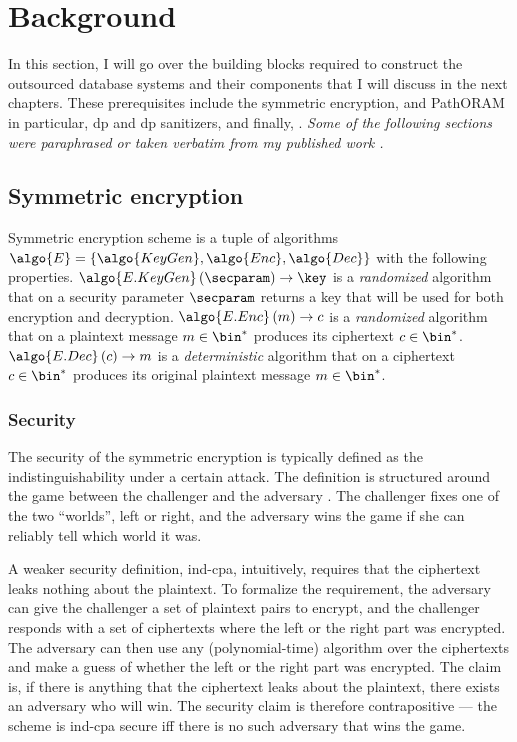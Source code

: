 \chapter{Background}\label{section:background}
\thispagestyle{myheadings}

	In this section, I will go over the building blocks required to construct the outsourced database systems and their components that I will discuss in the next chapters.
	These prerequisites include the symmetric encryption,  and PathORAM \cite{path-oram} in particular, \acrlong{dp} and \acrshort{dp} sanitizers, and finally, .
	\emph{Some of the following sections were paraphrased or taken verbatim from my published work \cite{ore-benchmark-17,epsolute}.}

	\section{Symmetric encryption}\label{section:background:encryption}

		Symmetric encryption scheme is a tuple of algorithms $\algo{E} = \{ \algo{KeyGen}, \algo{Enc}, \algo{Dec} \}$ with the following properties.
		$\algo{E.KeyGen} \left( \secparam \right) \to \key$ is a \emph{randomized} algorithm that on a security parameter $\secparam$ returns a key that will be used for both encryption and decryption.
		$\algo{E.Enc} \left( m \right) \to c$ is a \emph{randomized} algorithm that on a plaintext message $m \in \bin^*$ produces its ciphertext $c \in \bin^*$.
		$\algo{E.Dec} \left( c \right) \to m$ is a \emph{deterministic} algorithm that on a ciphertext $c \in \bin^*$ produces its original plaintext message $m \in \bin^*$.

		\subsection{Security}

			The security of the symmetric encryption is typically defined as the indistinguishability under a certain attack.
			The definition is structured around the game between the challenger and the adversary \adversary{}.
			The challenger fixes one of the two ``worlds'', left or right, and the adversary wins the game if she can reliably tell which world it was.

			A weaker security definition, \acrfull{ind-cpa}, intuitively, requires that the ciphertext leaks nothing about the plaintext.
			To formalize the requirement, the adversary can give the challenger a set of plaintext pairs to encrypt, and the challenger responds with a set of ciphertexts where the left or the right part was encrypted.
			The adversary can then use any (polynomial-time) algorithm over the ciphertexts and make a guess of whether the left or the right part was encrypted.
			The claim is, if there is anything that the ciphertext leaks about the plaintext, there exists an adversary who will win.
			The security claim is therefore contrapositive --- the scheme is \acrshort{ind-cpa} secure iff there is no such adversary that wins the game.

